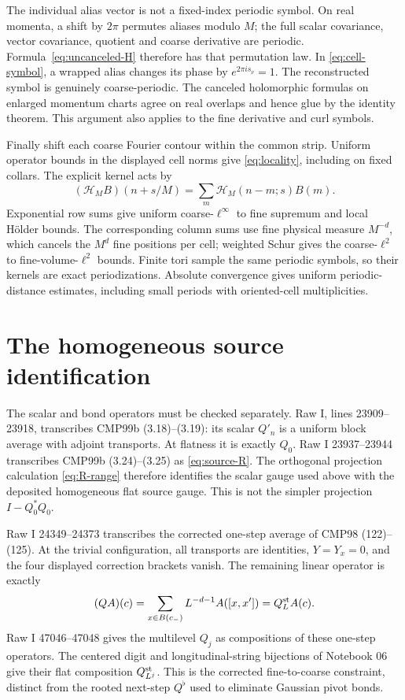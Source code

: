 \documentclass[11pt]{article}
\theoremstyle{remark}
\newcommand{\HH}{\mathcal H}
\begin{document}
The individual alias vector is not a fixed-index periodic symbol.
On real momenta, a shift by $2\pi$ permutes aliases modulo $M$;
the full scalar covariance, vector covariance, quotient and coarse
derivative are periodic. Formula~\eqref{eq:uncanceled-H} therefore
has that permutation law. In \eqref{eq:cell-symbol}, a wrapped
alias changes its phase by $e^{2\pi i s_\nu}=1$.
The reconstructed symbol is genuinely coarse-periodic. The canceled
holomorphic formulas on enlarged momentum charts agree on real
overlaps and hence glue by the identity theorem. This argument
also applies to the fine derivative and curl symbols.

Finally shift each coarse Fourier contour within the common strip.
Uniform operator bounds in the displayed cell norms give
\eqref{eq:locality}, including on fixed collars. The explicit
kernel acts by
\[
 (\HH_MB)(n+s/M)=\sum_m\HH_M(n-m;s)B(m).
\]
Exponential row sums give uniform coarse-$\ell^\infty$ to fine
supremum and local H\"older bounds. The corresponding column sums
use fine physical measure $M^{-d}$, which cancels the $M^d$ fine
positions per cell; weighted Schur gives the coarse-$\ell^2$ to
fine-volume-$\ell^2$ bounds. Finite tori sample the same periodic
symbols, so their kernels are exact periodizations. Absolute
convergence gives uniform periodic-distance estimates, including
small periods with oriented-cell multiplicities.

\section{The homogeneous source identification}\label{sec:source}

The scalar and bond operators must be checked separately. Raw I,
lines 23909--23918, transcribes CMP99b (3.18)--(3.19): its scalar
$Q'_n$ is a uniform block average with adjoint transports.
At flatness it is exactly $Q_0$. Raw I 23937--23944 transcribes
CMP99b (3.24)--(3.25) as \eqref{eq:source-R}. The orthogonal
projection calculation \eqref{eq:R-range} therefore identifies
the scalar gauge used above with the deposited homogeneous flat
source gauge. This is not the simpler projection $I-Q_0^*Q_0$.

Raw I 24349--24373 transcribes the corrected one-step average
of CMP98 (122)--(125). At the trivial configuration, all transports
are identities, $Y=Y_x=0$, and the four displayed correction
brackets vanish. The remaining linear operator is exactly
\[
 (QA)(c)=\sum_{x\in B(c_-)}L^{-d-1}A([x,x'])=Q_L^{\rm st}A(c).
\]
Raw I 47046--47048 gives the multilevel $Q_j$ as compositions of
these one-step operators. The centered digit and longitudinal-string
bijections of Notebook 06 give their flat composition
$Q_{L^j}^{\rm st}$. This is the corrected fine-to-coarse constraint,
distinct from the rooted next-step $Q^\flat$ used to eliminate
Gaussian pivot bonds.
\end{document}
